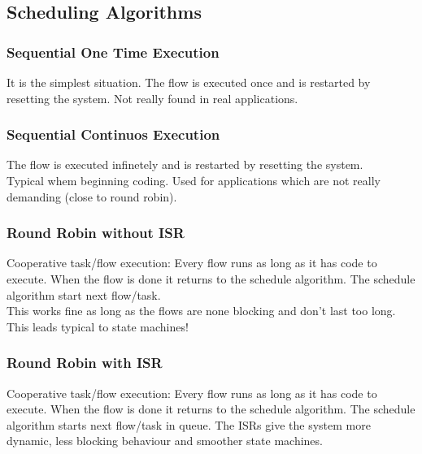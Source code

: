 \subsection{Scheduling Algorithms}

\subsubsection{Sequential One Time Execution}
\begin{paracol}{2}
  It is the simplest situation.
  The flow is executed once and is restarted by resetting the system.
  Not really found in real applications.
  \switchcolumn
  
\end{paracol}
\subsubsection{Sequential Continuos Execution}
\begin{paracol}{2}
  The flow is executed infinetely and is restarted by resetting the system.\\
  Typical whem beginning coding. Used for applications which are not really demanding (close to round robin).
  \switchcolumn
  
\end{paracol}

\subsubsection{Round Robin without ISR}
\begin{paracol}{2}
  Cooperative task/flow execution: Every flow runs as long as it has code to execute.
  When the flow is done it returns to the schedule algorithm.
  The schedule algorithm start next flow/task.\\
  This works fine as long as the flows are none blocking and don’t last too long.
  This leads typical to state machines!\\
  $ $\\
  \switchcolumn
  
\end{paracol}

\subsubsection{Round Robin with ISR}
Cooperative task/flow execution: Every flow runs as long as it has code to execute.
When the flow is done it returns to the schedule algorithm.
The schedule algorithm starts next flow/task in queue.
The ISRs give the system more dynamic, less blocking behaviour and smoother state machines.
\begin{paracol}{2}
  
  \switchcolumn
  
\end{paracol}


